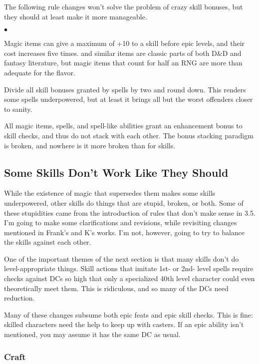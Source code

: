 The following rule changes won't solve the problem of crazy skill bonuses, but they should at least make it more manageable.

\begin{list}{$\bullet$}{\itemspace}
	\item Magic items can give a maximum of +10 to a skill before epic levels, and their cost increases five times.  and similar items are classic parts of both D\&D and fantasy literature, but magic items that count for half an RNG are more than adequate for the flavor.
	\item Divide all skill bonuses granted by spells by two and round down. This renders some spells underpowered, but at least it brings all but the worst offenders closer to sanity.
	\item All magic items, spells, and spell-like abilities grant an enhancement bonus to skill checks, and thus do not stack with each other. The bonus stacking paradigm is broken, and nowhere is it more broken than for skills.
\end{list}

\subsection{Some Skills Don't Work Like They Should}

While the existence of magic that supersedes them makes some skills underpowered, other skills do things that are stupid, broken, or both. Some of these stupidities came from the introduction of rules that don't make sense in 3.5. I'm going to make some clarifications and revisions, while revisiting changes mentioned in Frank's and K's works. I'm not, however, going to try to balance the skills against each other.

One of the important themes of the next section is that many skills don't do level-appropriate things. Skill actions that imitate 1st- or 2nd- level spells require checks against DCs so high that only a specialized 40th level character could even theoretically meet them. This is ridiculous, and so many of the DCs need reduction.

Many of these changes subsume both epic feats and epic skill checks. This is fine: skilled characters need the help to keep up with casters. If an epic ability isn't mentioned, you may assume it has the same DC as usual.

\subsubsection{Craft}

